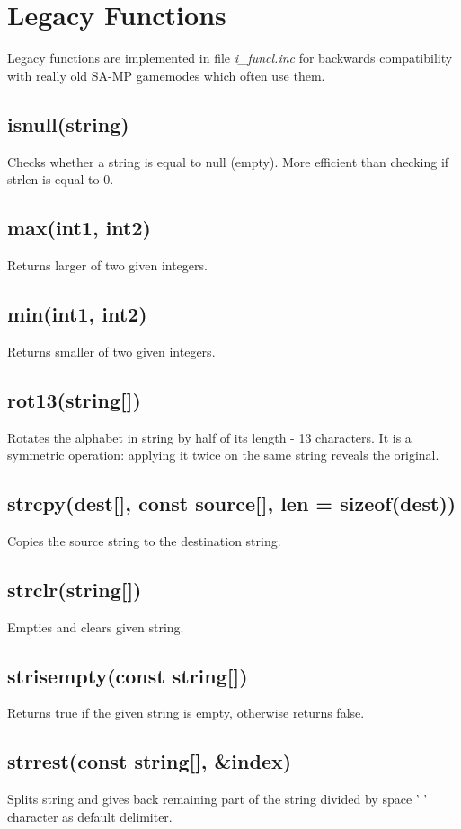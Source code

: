 \documentclass{article}
\begin{document}
\newpage
\section{Legacy Functions}
Legacy functions are implemented in file \textit{i\_funcl.inc} for backwards compatibility with really old SA-MP gamemodes which often use them.

\subsection{isnull(string)}
Checks whether a string is equal to null (empty). More efficient than checking if strlen is equal to 0.

\subsection{max(int1, int2)}
Returns larger of two given integers.

\subsection{min(int1, int2)}
Returns smaller of two given integers.

\subsection{rot13(string[])}
Rotates the alphabet in string by half of its length - 13 characters. It is a symmetric operation: applying it twice on the same string reveals the original.

\subsection{strcpy(dest[], const source[], len = sizeof(dest))}
Copies the source string to the destination string.

\subsection{strclr(string[])}
Empties and clears given string.

\subsection{strisempty(const string[])}
Returns true if the given string is empty, otherwise returns false.

\subsection{strrest(const string[], \&index)}
Splits string and gives back remaining part of the string divided by space ' ' character as default delimiter.
\end{document}
